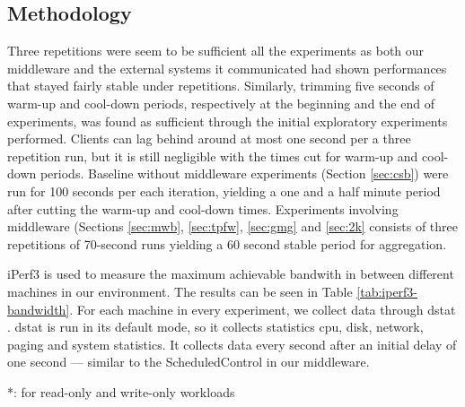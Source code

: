 \documentclass[11pt,a4paper]{article}
\begin{document}
\subsection{Methodology} \label{sec:ov-methodology}
\par Three repetitions were seem to be sufficient all the experiments as both our middleware and the external systems it communicated had shown performances that stayed fairly stable under repetitions. Similarly, trimming five seconds of warm-up and cool-down periods, respectively at the beginning and the end of experiments, was found as sufficient through the initial exploratory experiments performed. Clients can lag behind around at most one second per a three repetition run, but it is still negligible with the times cut for warm-up and cool-down periods. Baseline without middleware experiments (Section \ref{sec:csb}) were run for 100 seconds per each iteration, yielding a one and a half minute period after cutting the warm-up and cool-down times. Experiments involving middleware (Sections \ref{sec:mwb}, \ref{sec:tpfw}, \ref{sec:gmg} and \ref{sec:2k} consists of three repetitions of 70-second runs yielding a 60 second stable period for aggregation.
\par iPerf3 \cite{iperf} is used to measure the maximum achievable bandwith in between different machines in our environment. The results can be seen in Table \ref{tab:iperf3-bandwidth}. For each machine in every experiment, we collect data through dstat \cite{dstat}. dstat is run in its default mode, so it collects statistics cpu, disk, network, paging and system  statistics. It collects data every second after an initial delay of one second — similar to the ScheduledControl in our middleware.
\begin{table}[h]
\centering
{}
{*: for read-only and write-only workloads}
\caption{Maximum achievable bandwidth values for all machines, obtained using iperf3. So-called ``effective bandwidth'' is the maximum bandwidth a machine can utilize only with the set queries or get replies. It is an informal measure that comes as useful while analyzing read-only and write-only workloads in later sections.} \label{tab:iperf3-bandwidth}
\end{table}
\end{document}
